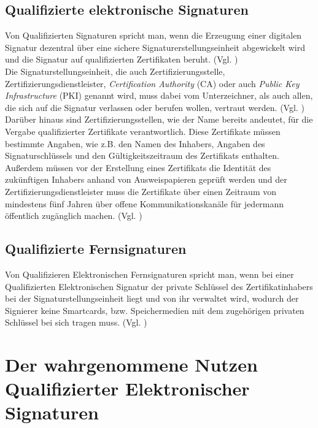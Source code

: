 \documentclass[deutsch]{lib/llncs/llncs}
\begin{document}
\subsection{Qualifizierte elektronische Signaturen}
Von Qualifizierten Signaturen spricht man, wenn die Erzeugung einer digitalen Signatur dezentral über eine sichere Signaturerstellungseinheit abgewickelt wird und die Signatur auf qualifizierten Zertifikaten beruht. (Vgl. \cite[S. 8]{Zitat07}) \\
Die Signaturstellungseinheit, die auch Zertifizierungsstelle, Zertifizierungsdienstleister, \textit{Certification Authority} (CA) oder auch \textit{Public Key Infrastructure} (PKI) genannt wird, muss dabei vom Unterzeichner, als auch allen, die sich auf die Signatur verlassen oder berufen wollen, vertraut werden. (Vgl. \cite[S. 9]{Zitat07}) \\
Darüber hinaus sind Zertifizierungsstellen, wie der Name bereits andeutet, für die Vergabe qualifizierter Zertifikate verantwortlich. 
Diese Zertifikate müssen bestimmte Angaben, wie z.B. den Namen des Inhabers, Angaben des Signaturschlüssels und den Gültigkeitszeitraum des Zertifikats enthalten. Außerdem müssen vor der Erstellung eines Zertifikats die Identität des zukünftigen Inhabers anhand von Ausweispapieren geprüft werden und der Zertifizierungsdienstleister muss die Zertifikate über einen Zeitraum von mindestens fünf Jahren über offene Kommunikationskanäle für jedermann öffentlich zugänglich machen. (Vgl. \cite[S. 9]{Zitat07}) 


\subsection{Qualifizierte Fernsignaturen}
Von Qualifizieren Elektronischen Fernsignaturen spricht man, wenn bei einer Qualifizierten Elektronischen Signatur der private Schlüssel des Zertifikatinhabers bei der Signaturstellungseinheit liegt und von ihr verwaltet wird, wodurch der Signierer keine Smartcards, bzw. Speichermedien mit dem zugehörigen privaten Schlüssel bei sich tragen muss. (Vgl. \cite[S. 30]{Zitat08})


\section{Der wahrgenommene Nutzen Qualifizierter Elektronischer Signaturen}
\end{document}
